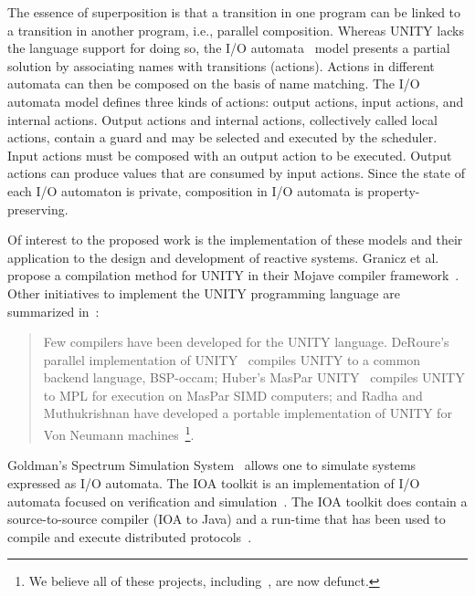 The essence of superposition is that a transition in one program can be linked to a transition in another program, i.e., parallel composition.
Whereas UNITY lacks the language support for doing so, the I/O automata~\cite{nancy1996distributed} model presents a partial solution by associating names with transitions (actions).
Actions in different automata can then be composed on the basis of name matching.
The I/O automata model defines three kinds of actions:  output actions, input actions, and internal actions.
Output actions and internal actions, collectively called local actions, contain a guard and may be selected and executed by the scheduler.
Input actions must be composed with an output action to be executed.
Output actions can produce values that are consumed by input actions.
Since the state of each I/O automaton is private, composition in I/O automata is property-preserving.

Of interest to the proposed work is the implementation of these models and their application to the design and development of reactive systems.
Granicz et al. propose a compilation method for UNITY in their Mojave compiler framework~\cite{GZH03}.
Other initiatives to implement the UNITY programming language are summarized in~\cite{GZH03}:
\begin{quotation}
Few compilers have been developed for the UNITY language.
DeRoure's parallel implementation of UNITY~\cite{deroure1991parallel} compiles UNITY to a common backend language, BSP-occam; Huber's MasPar UNITY~\cite{huber1992maspar} compiles UNITY to MPL for execution on MasPar SIMD computers; and Radha and Muthukrishnan have developed a portable implementation of UNITY for Von Neumann machines~\cite{radha1993portable}\footnote{We believe all of these projects, including~\cite{GZH03}, are now defunct.}.
\end{quotation}
Goldman's Spectrum Simulation System~\cite{goldman1990distributed} allows one to simulate systems expressed as I/O automata.
The IOA toolkit is an implementation of I/O automata focused on verification and simulation~\cite{ioatoolkit}.
The IOA toolkit does contain a source-to-source compiler (IOA to Java) and a run-time that has been used to compile and execute distributed protocols~\cite{georgiou2009automated}.

